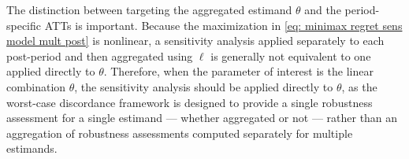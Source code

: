 \documentclass[twoside,11pt]{article}
\begin{document}
The distinction between targeting the aggregated estimand $\theta$ and the period-specific \textrm{ATT}s is important. Because the maximization in \eqref{eq: minimax regret sens model mult post} is nonlinear, a sensitivity analysis applied separately to each post-period and then aggregated using $\bm{\ell}$ is generally not equivalent to one applied directly to $\theta$. Therefore, when the parameter of interest is the linear combination $\theta$, the sensitivity analysis should be applied directly to $\theta$, as the worst-case discordance framework is designed to provide a single robustness assessment for a single estimand --- whether aggregated or not --- rather than an aggregation of robustness assessments computed separately for multiple estimands.




\end{document}
